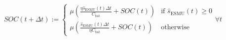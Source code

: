 \begin{equation}
	SOC(t+\Delta t) := 
	\begin{cases}
		\mu\left(\frac{\eta \hat{s}_\text{ESMU}(t)\Delta t}{C_\text{bat}} + SOC(t)\right)	&\text{if } \hat{s}_\text{ESMU}(t) \geq 0\\
		\mu\left(\frac{\hat{s}_\text{ESMU}(t)\Delta t}{\eta C_\text{bat}} + SOC(t)\right) &\text{otherwise}
	\end{cases}
	\forall t
	\label{ch1:equ:next-state-of-charge-2}
\end{equation}
